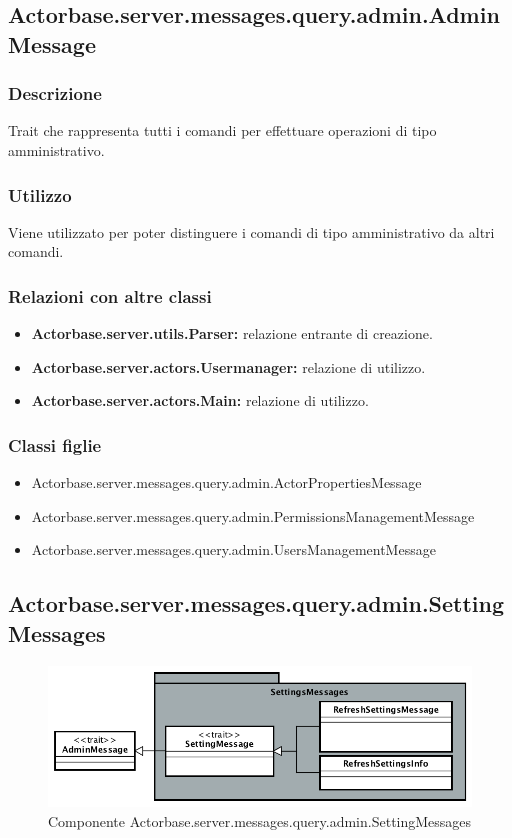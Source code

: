 \documentclass[a4paper]{article}
\begin{document}
		\subsection{Actorbase.server.messages.query.admin.AdminMessage}
			\subsubsection{Descrizione}
				Trait che rappresenta tutti i comandi per effettuare operazioni di tipo amministrativo.
				
			\subsubsection{Utilizzo}
				Viene utilizzato per poter distinguere i comandi di tipo amministrativo da altri comandi.
				
			\subsubsection{Relazioni con altre classi}
				\begin{itemize}
					\item \textbf{Actorbase.server.utils.Parser:} relazione entrante di creazione.
					\item \textbf{Actorbase.server.actors.Usermanager:} relazione di utilizzo.
					\item \textbf{Actorbase.server.actors.Main:} relazione di utilizzo.
				\end{itemize}
			\subsubsection{Classi figlie}
				\begin{itemize}
					\item Actorbase.server.messages.query.admin.ActorPropertiesMessage
					\item Actorbase.server.messages.query.admin.PermissionsManagementMessage
					\item Actorbase.server.messages.query.admin.UsersManagementMessage
				\end{itemize}
		
		\subsection{Actorbase.server.messages.query.admin.SettingMessages}
					\begin{figure}[H]
				\centering
				\includegraphics[width=\textwidth]{ST/Server/levelSettingsMessages.png}
				\caption{Componente Actorbase.server.messages.query.admin.SettingMessages}
			\end{figure}
\end{document}
